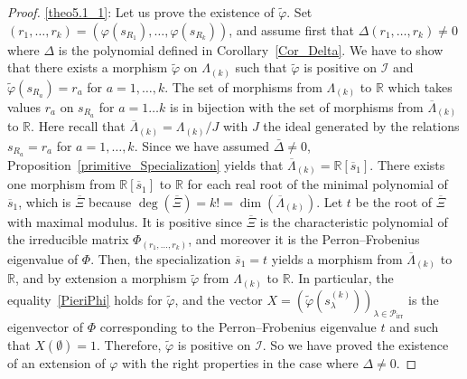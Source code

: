 \documentclass[10pt,a4paper]{amsart}
\theoremstyle{definition}
\DeclareMathOperator{\irr}{irr}
\begin{document}
\begin{proof}
\eqref{theo5.1_1}: Let us prove the existence of $\tilde{\varphi}$. Set $(r_{1},\ldots,
r_{k})=(\varphi(s_{R_{1}}),\ldots,\varphi(s_{R_{k}}))$, and assume first that
$\Delta(r_{1},\ldots,r_{k})\not =0$ where $\Delta$ is the polynomial defined
in Corollary~\ref{Cor_Delta}. We have to show that there exists a morphism
$\widetilde{\varphi}$ on $\Lambda_{(k)}$ such that $\widetilde{\varphi}$ is
positive on $\mathcal{I}$ and $\widetilde{\varphi}(s_{R_{a}})=r_{a}$ for
$a=1,\ldots,k$. The set of morphisms from $\Lambda_{(k)}$ to $\mathbb{R}$
which takes values $r_{a}$ on $s_{R_{a}}$ for $a=1\ldots k$ is in bijection
with the set of morphisms from $\overline{\Lambda}_{(k)}$ to $\mathbb{R}.$
Here recall that $\overline{\Lambda}_{(k)}=\Lambda_{(k)}/J$ with $J$ the ideal
generated by the relations $s_{R_{a}}=r_{a}$ for $a=1,\ldots,k$. Since we have
assumed $\bar{\Delta}\not =0$, Proposition~\ref{primitive_Specialization}
yields that $\overline{\Lambda}_{(k)}=\mathbb{R}[\overline{s}_{1}]$. There
exists one morphism from $\mathbb{R}[\overline{s}_{1}]$ to $\mathbb{R}$ for
each real root of the minimal polynomial of $\overline{s}_{1}$, which is
$\overline{\Xi}$ because $\deg(\overline{\Xi})=k!=\dim(\overline{\Lambda
}_{(k)})$. Let $t$ be the root of $\overline{\Xi}$ with maximal modulus. It is
positive since $\overline{\Xi}$ is the characteristic polynomial of the
irreducible matrix $\Phi_{(r_{1},\ldots,r_{k})}$, and moreover it is the
Perron--Frobenius eigenvalue of $\Phi$. Then, the specialization $\overline
{s}_{1}=t$ yields a morphism from $\overline{\Lambda}_{(k)}$ to $\mathbb{R}$,
and by extension a morphism $\widetilde{\varphi}$ from $\Lambda_{(k)}$ to
$\mathbb{R}$. In particular, the equality~\eqref{PieriPhi} holds for
$\widetilde{\varphi}$, and the vector $X=(\widetilde{\varphi}(s_{\lambda
}^{(k)}))_{\lambda\in\mathcal{P}_{\irr }}$ is the eigenvector of $\Phi$
corresponding to the Perron--Frobenius eigenvalue $t$ and such that
$X(\emptyset)=1$. Therefore, $\widetilde{\varphi}$ is positive on
$\mathcal{I}$. So we have proved the existence of an extension of $\varphi$
with the right properties in the case where $\Delta\neq0$.


\end{proof}
\end{document}
